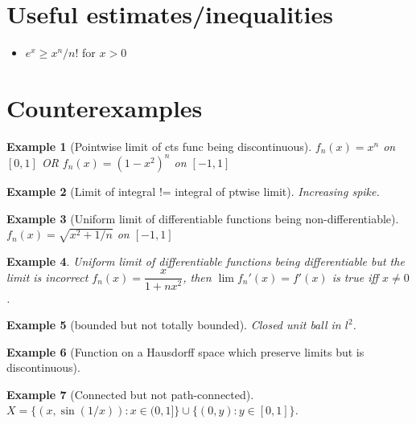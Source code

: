 \documentclass{article}
\theoremstyle{definition}
\theoremstyle{remark}
\theoremstyle{plain}
\newtheorem{example}{Example}
\theoremstyle{definition}
\begin{document}
\section{Useful estimates/inequalities}
\begin{itemize}
    \item $e^x\ge x^n/n!$ for $x>0$
\end{itemize}
\section{Counterexamples}
\begin{example}[Pointwise limit of cts func being discontinuous]
    $f_n(x)=x^n$ on $[0,1]$ OR $f_n(x)=(1-x^2)^n$ on $[-1,1]$
\end{example}
\begin{example}[Limit of integral != integral of ptwise limit]
    Increasing spike.
\end{example}
\begin{example}[Uniform limit of differentiable functions being non-differentiable]
    $f_n(x)=\sqrt{x^2+1/n}$ on $[-1,1]$
\end{example}
\begin{example}Uniform limit of differentiable functions being differentiable but the limit is incorrect
    $f_n(x)=\dfrac{x}{1+nx^2}$, then $\lim f_n'(x)=f'(x)$ is true iff $x\neq 0$.
\end{example}

\begin{example}[bounded but not totally bounded]
    Closed unit ball in $l^2$.
\end{example}

\begin{example}[Function on a Hausdorff space which preserve limits but is discontinuous]
    
\end{example}

\begin{example}[Connected but not path-connected]
    $X=\{(x,\sin(1/x)):x\in(0,1]\}\cup \{(0,y):y\in[0,1]\}$.
\end{example}
\end{document}
